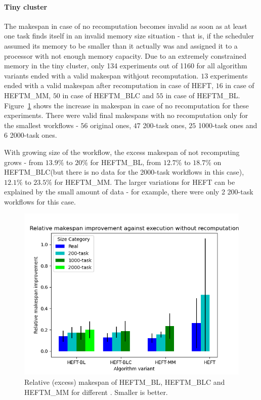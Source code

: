 \documentclass[conference]{IEEEtran}
\newcommand{\algo}[1]{\textsc{#1}}
\newcommand{\heft}{\algo{HEFT}\xspace}
\newcommand{\heftmm}{\algo{HEFTM\_MM}\xspace}
\newcommand{\heftbl}{\algo{HEFTM\_BL}\xspace}
\newcommand{\heftblc}{\algo{HEFTM\_BLC}\xspace}
\begin{document}
    \paragraph{Tiny cluster}
    The makespan in case of no recomputation becomes invalid as soon as at least one task finds itself in an invalid memory size
    situation - that is, if the scheduler assumed its memory to be smaller than it actually was and assigned it to a processor
    with not enough memory capacity.
    Due to an extremely constrained memory in the tiny cluster, only 134 experiments out of 1160 for all algorithm variants
    ended with a valid makespan withjout recomputation. $13$ experiments ended with a valid makespan after recomputation in case of \heft,
   $16$ in case of \heftmm, $50$ in case of \heftblc and $55$ in case of \heftbl.
    Figure~\ref{fig:updates-ms} shows the increase in makespan in case of no recomputation for these experiments.
    There were valid final makespans with no recomputation only for the smallest workflows - $56$ original ones, $47$ 200-task ones,
    $25$ 1000-task ones and $6$ 2000-task ones.

    With growing size of the workflow, the excess makespan of not recomputing grows - from $13.9\%$ to $20\%$ for \heftbl,
    from $12.7\%$ to $18.7\%$ on \heftblc (but there is no data for the 2000-task workflows in this case), $12.1\%$ to $23.5\%$
    for \heftmm.
    The larger variations for \heft can be explained by the small amount of data - for example, there were only 2 200-task
    workflows for this case.

    \begin{figure}[tb]
        \centering
        \includegraphics[width=0.495\columnwidth] {images/UpdatesMss2}
        \caption{Relative (excess) makespan of \heftbl, \heftblc and \heftmm for different . Smaller is better.}
        \label{fig:updates-ms}
        \vspace{-0.3cm}
    \end{figure}
\end{document}
